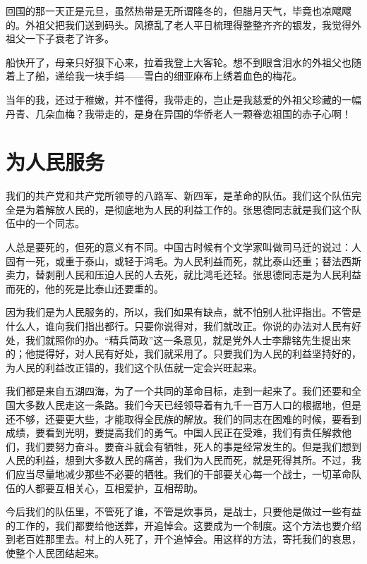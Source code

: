 \documentclass[12pt,UTF-8,openany]{ctexbook}
\begin{document}
\begin{large}
    回国的那一天正是元旦，虽然热带是无所谓隆冬的，但腊月天气，毕竟也凉飕飕的。外祖父把我们送到码头。风撩乱了老人平日梳理得整整齐齐的银发，我觉得外祖父一下子衰老了许多。
    
    船快开了，母亲只好狠下心来，拉着我登上大客轮。想不到眼含泪水的外祖父也随着上了船，递给我一块手绢——雪白的细亚麻布上绣着血色的梅花。
    
    当年的我，还过于稚嫩，并不懂得，我带走的，岂止是我慈爱的外祖父珍藏的一幅丹青、几朵血梅？我带走的，是身在异国的华侨老人一颗眷恋祖国的赤子心啊！
    
\end{large}



\chapter{为人民服务}

\begin{large}
    
    我们的共产党和共产党所领导的八路军、新四军，是革命的队伍。我们这个队伍完全是为着解放人民的，是彻底地为人民的利益工作的。张思德同志就是我们这个队伍中的一个同志。
    
    人总是要死的，但死的意义有不同。中国古时候有个文学家叫做司马迁的说过：人固有一死，或重于泰山，或轻于鸿毛。为人民利益而死，就比泰山还重；替法西斯卖力，替剥削人民和压迫人民的人去死，就比鸿毛还轻。张思德同志是为人民利益而死的，他的死是比泰山还要重的。
    
    因为我们是为人民服务的，所以，我们如果有缺点，就不怕别人批评指出。不管是什么人，谁向我们指出都行。只要你说得对，我们就改正。你说的办法对人民有好处，我们就照你的办。“精兵简政”这一条意见，就是党外人士李鼎铭先生提出来的；他提得好，对人民有好处，我们就采用了。只要我们为人民的利益坚持好的，为人民的利益改正错的，我们这个队伍就一定会兴旺起来。
    
    我们都是来自五湖四海，为了一个共同的革命目标，走到一起来了。我们还要和全国大多数人民走这一条路。我们今天已经领导着有九千一百万人口的根据地，但是还不够，还要更大些，才能取得全民族的解放。我们的同志在困难的时候，要看到成绩，要看到光明，要提高我们的勇气。中国人民正在受难，我们有责任解救他们，我们要努力奋斗。要奋斗就会有牺牲，死人的事是经常发生的。但是我们想到人民的利益，想到大多数人民的痛苦，我们为人民而死，就是死得其所。不过，我们应当尽量地减少那些不必要的牺牲。我们的干部要关心每一个战士，一切革命队伍的人都要互相关心，互相爱护，互相帮助。
    
    今后我们的队伍里，不管死了谁，不管是炊事员，是战士，只要他是做过一些有益的工作的，我们都要给他送葬，开追悼会。这要成为一个制度。这个方法也要介绍到老百姓那里去。村上的人死了，开个追悼会。用这样的方法，寄托我们的哀思，使整个人民团结起来。
    
\end{large}
\end{document}

